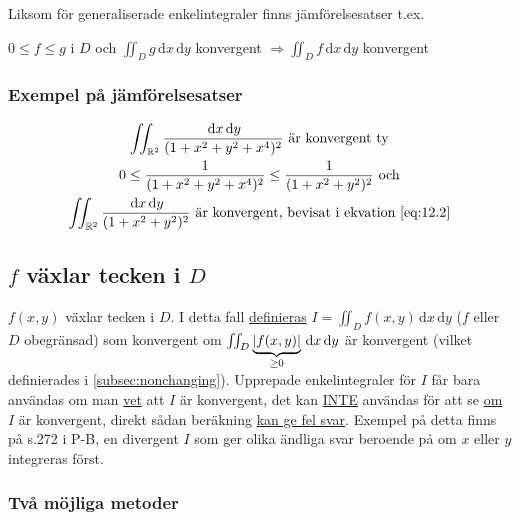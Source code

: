 \documentclass[a4paper]{article}
\newcommand{\de}[1]{\,\mathrm{d}#1}
\DeclarePairedDelimiter \abs{\lvert}{\rvert}
\begin{document}
\newpage

Liksom för generaliserade enkelintegraler finns jämförelsesatser t.ex. \newline

$0 \leq f \leq g$ i $D$ och $\iint_D g \de{x}\de{y}$ konvergent $\Rightarrow \iint_D f\de{x}\de{y}$ konvergent

\subsubsection{Exempel på jämförelsesatser}

\begin{gather*}
	\iint_{\mathbb{R}^2} \frac{\de{x}\de{y}}{(1+x^2+y^2+x^4)^2} \text{ är konvergent ty} \\
	0 \leq \frac{1}{(1+x^2+y^2+x^4)^2} \leq \frac{1}{(1+x^2+y^2)^2} \text{ och} \\
	\iint_{\mathbb{R}^2} \frac{\de{x}\de{y}}{(1+x^2+y^2)^2} \text{ är konvergent, bevisat i ekvation \eqref{eq:12.2}}
\end{gather*}

\subsection{\texorpdfstring{$f$}{f} växlar tecken i \texorpdfstring{$D$}{D}}
$f(x,y)$ växlar tecken i $D$. I detta fall \underline{definieras} $I=\iint_D f(x,y)\de{x}\de{y}$ ($f$ eller $D$ obegränsad) som konvergent om
$\iint_D\underbrace{\abs{f(x,y)}}_{\geq 0}\de{x}\de{y}$ är konvergent (vilket definierades i \vref{subsec:nonchanging}).
Upprepade enkelintegraler för $I$ får bara användas om man \underline{vet} att $I$ är konvergent, det kan \underline{INTE} användas för att se \underline{om} $I$ är konvergent,
direkt sådan beräkning \underline{kan ge fel svar}. \newline Exempel på detta finns på s.272 i P-B, en divergent $I$ som ger olika ändliga svar beroende på om $x$ eller $y$ integreras först.

\subsubsection{Två möjliga metoder}
\end{document}
